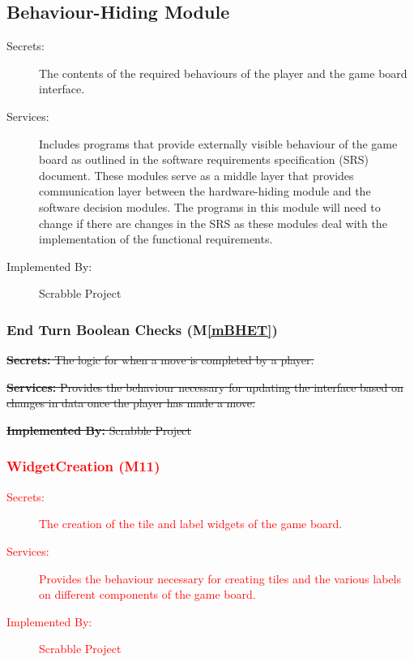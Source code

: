 \documentclass[12pt, titlepage]{article}
\newcommand{\mref}[1]{M\ref{#1}}
\begin{document}
\subsection{Behaviour-Hiding Module}
\begin{description}
\item[Secrets:]The contents of the required behaviours of the player and the game board interface.
\item[Services:]Includes programs that provide externally visible behaviour of
  the game board as outlined in the software requirements specification (SRS)
  document. These modules serve as a middle layer that provides communication layer between the hardware-hiding module and the software decision modules. The programs in this module will need to change if there are changes in the SRS as these modules deal with the implementation of the functional requirements.
\item[Implemented By:] Scrabble Project
\end{description}

\subsubsection{End Turn Boolean Checks (\mref{mBHET})}
\begin{description}
\item \sout{ \textbf{Secrets:} The logic for when a move is completed by a player.}
\item \sout{\textbf{Services:} Provides the behaviour necessary for updating the interface based on changes in data once the player has made a move.}
\item \sout{\textbf{Implemented By:} Scrabble Project}
\end{description}

\textcolor{red}{\subsubsection{WidgetCreation (M11)}
\begin{description}
\item [Secrets:] The creation of the tile and label widgets of the game board.
\item [Services:] Provides the behaviour necessary for creating tiles and the various labels on different components of the game board.
\item [Implemented By:] Scrabble Project
\end{description}}
\end{document}
